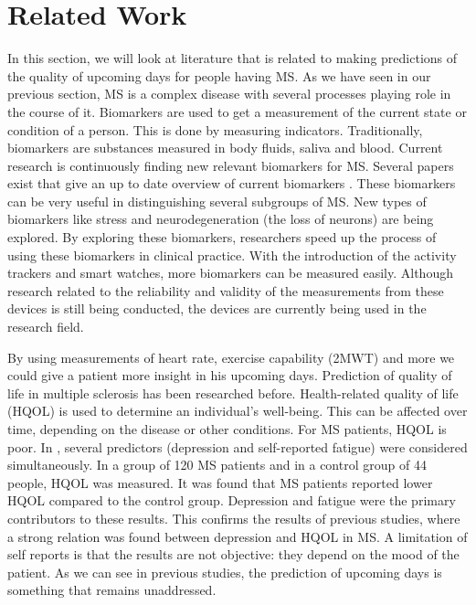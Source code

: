 \section{Related Work}
In this section, we will look at literature that is related to making predictions of the quality of upcoming days for people having MS.
As we have seen in our previous section, MS is a complex disease with several processes playing role in the course of it.
Biomarkers are used to get a measurement of the current state or condition of a person.
This is done by measuring indicators.
Traditionally, biomarkers are substances measured in body fluids, saliva and blood.
Current research is continuously finding new relevant biomarkers for MS.
Several papers exist that give an up to date overview of current biomarkers \cite{bielekova2004development, katsavos2013biomarkers}. 
These biomarkers can be very useful in distinguishing several subgroups of MS.
New types of biomarkers like stress and neurodegeneration (the loss of neurons) are being explored.
By exploring these biomarkers, researchers speed up the process of using these biomarkers in clinical practice.
With the introduction of the activity trackers and smart watches, more biomarkers can be measured easily.
Although research related to the reliability and validity of the measurements from these devices is still being conducted, the devices are currently being used in the research field.

By using measurements of heart rate, exercise capability (2MWT) and more we could give a patient more insight in his upcoming days.
Prediction of quality of life in multiple sclerosis has been researched before. 
Health-related quality of life (HQOL) is used to determine an individual's well-being. 
This can be affected over time, depending on the disease or other conditions.
For MS patients, HQOL is poor.
In \cite{benedict2005predicting}, several predictors (depression and self-reported fatigue) were considered simultaneously.
In a group of 120 MS patients and in a control group of 44 people, HQOL was measured.
It was found that MS patients reported lower HQOL compared to the control group.
Depression and fatigue were the primary contributors to these results.
This confirms the results of previous studies, where a strong relation was found between depression and HQOL in MS.
A limitation of self reports is that the results are not objective: they depend on the mood of the patient.
As we can see in previous studies, the prediction of upcoming days is something that remains unaddressed.


